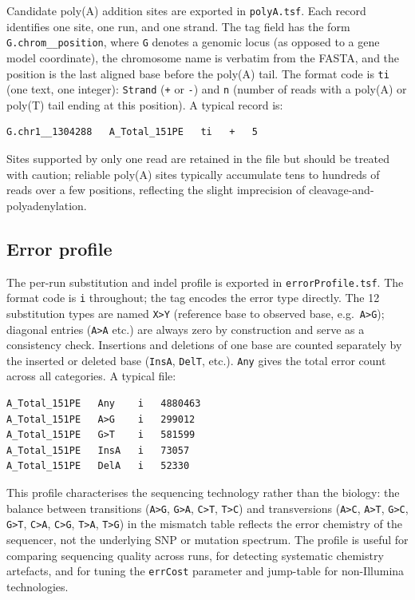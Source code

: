 \documentclass[11pt]{article}
\begin{document}
Candidate poly(A) addition sites are exported in \texttt{polyA.tsf}.
Each record identifies one site, one run, and one strand.
The tag field has the form \texttt{G.chrom\_\_position}, where
\texttt{G} denotes a genomic locus (as opposed to a gene model
coordinate), the chromosome name is verbatim from the FASTA, and
the position is the last aligned base before the poly(A) tail.
The format code is \texttt{ti} (one text, one integer):
\texttt{Strand} (\texttt{+} or \texttt{-}) and \texttt{n}
(number of reads with a poly(A) or poly(T) tail ending at this
position).
A typical record is:
\begin{lstlisting}
G.chr1__1304288   A_Total_151PE   ti   +   5
\end{lstlisting}
Sites supported by only one read are retained in the file but
should be treated with caution; reliable poly(A) sites typically
accumulate tens to hundreds of reads over a few
positions, reflecting the slight imprecision of cleavage-and-polyadenylation.

\subsection{Error profile}
\label{sec:error_profile}

The per-run substitution and indel profile is exported in
\texttt{errorProfile.tsf}.
The format code is \texttt{i} throughout; the tag encodes the
error type directly.
The 12 substitution types are named \texttt{X>Y} (reference base
to observed base, e.g.\ \texttt{A>G}); diagonal entries
(\texttt{A>A} etc.) are always zero by construction and serve as
a consistency check.
Insertions and deletions of one base are counted separately by
the inserted or deleted base (\texttt{InsA}, \texttt{DelT},
etc.).
\texttt{Any} gives the total error count across all categories.
A typical file:
\begin{lstlisting}
A_Total_151PE   Any    i   4880463
A_Total_151PE   A>G    i   299012
A_Total_151PE   G>T    i   581599
A_Total_151PE   InsA   i   73057
A_Total_151PE   DelA   i   52330
\end{lstlisting}
This profile characterises the sequencing technology rather than
the biology: the balance between transitions (\texttt{A>G},
\texttt{G>A}, \texttt{C>T}, \texttt{T>C}) and transversions
(\texttt{A>C}, \texttt{A>T}, \texttt{G>C}, \texttt{G>T},
\texttt{C>A}, \texttt{C>G}, \texttt{T>A}, \texttt{T>G}) in the
mismatch table reflects the error chemistry of the sequencer, not
the underlying SNP or mutation spectrum.
The profile is useful for comparing sequencing quality across runs,
for detecting systematic chemistry artefacts, and for tuning the
\texttt{errCost} parameter and jump-table for non-Illumina technologies.
\end{document}
